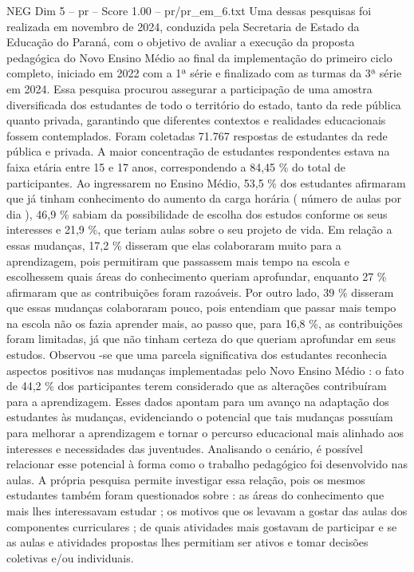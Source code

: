 \begin{textsample}{NEG Dim 5 – pr – Score 1.00 – pr/pr\_em\_6.txt}
Uma dessas pesquisas foi realizada em novembro de 2024, conduzida pela Secretaria de Estado da Educação do Paraná, com o objetivo de avaliar a execução da proposta pedagógica do Novo Ensino Médio ao final da implementação do primeiro ciclo completo, iniciado em 2022 com a 1ª série e finalizado com as turmas da 3ª série em 2024.
Essa pesquisa procurou assegurar a participação de uma amostra diversificada dos estudantes de todo o território do estado, tanto da rede pública quanto privada, garantindo que diferentes contextos e realidades educacionais fossem contemplados.
Foram coletadas 71.767 respostas de estudantes da rede pública e privada.
A maior concentração de estudantes respondentes estava na faixa etária entre 15 e 17 anos, correspondendo a 84,45 \% do total de participantes.
Ao ingressarem no Ensino Médio, 53,5 \% dos estudantes afirmaram que já tinham conhecimento do aumento da carga horária ( número de aulas por dia ), 46,9 \% sabiam da possibilidade de escolha dos estudos conforme os seus interesses e 21,9 \%, que teriam aulas sobre o seu projeto de vida.
Em relação a essas mudanças, 17,2 \% disseram que elas colaboraram muito para a aprendizagem, pois permitiram que passassem mais tempo na escola e escolhessem quais áreas do conhecimento queriam aprofundar, enquanto 27 \% afirmaram que as contribuições foram razoáveis.
Por outro lado, 39 \% disseram que essas mudanças colaboraram pouco, pois entendiam que passar mais tempo na escola não os fazia aprender mais, ao passo que, para 16,8 \%, as contribuições foram limitadas, já que não tinham certeza do que queriam aprofundar em seus estudos.
Observou -se que uma parcela significativa dos estudantes reconhecia aspectos positivos nas mudanças implementadas pelo Novo Ensino Médio : o fato de 44,2 \% dos participantes terem considerado que as alterações contribuíram para a aprendizagem.
Esses dados apontam para um avanço na adaptação dos estudantes às mudanças, evidenciando o potencial que tais mudanças possuíam para melhorar a aprendizagem e tornar o percurso educacional mais alinhado aos interesses e necessidades das juventudes.
Analisando o cenário, é possível relacionar esse potencial à forma como o trabalho pedagógico foi desenvolvido nas aulas.
A própria pesquisa permite investigar essa relação, pois os mesmos estudantes também foram questionados sobre : as áreas do conhecimento que mais lhes interessavam estudar ; os motivos que os levavam a gostar das aulas dos componentes curriculares ; de quais atividades mais gostavam de participar e se as aulas e atividades propostas lhes permitiam ser ativos e tomar decisões coletivas e/ou individuais.

\end{textsample}
